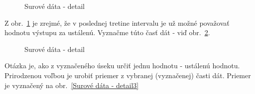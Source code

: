 \documentclass[a4paper, 10pt, ]{article}
\begin{document}
\begin{figure}[!ht]
	\centering






	\caption{Surové dáta - detail}
	\label{Surové dáta - detail}



\end{figure}


Z obr.~\ref{Surové dáta - detail} je zrejmé, že v poslednej tretine intervalu je už možné považovať hodnotu výstupu za ustálenú. Vyznačme túto časť dát - viď obr.~\ref{Surové dáta - detail2}.

\begin{figure}[!ht]
	\centering


    \vspace{-6pt}

	\caption{Surové dáta - detail}
	\label{Surové dáta - detail2}

\end{figure}


Otázka je, ako z vyznačeného úseku určiť jednu hodnotu - ustálenú hodnotu. Prirodzenou voľbou je urobiť priemer z vybranej (vyznačenej) časti dát. Priemer je vyznačený na obr.~\ref{Surové dáta - detail3}
\end{document}
